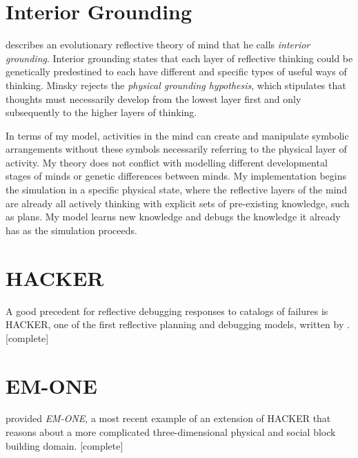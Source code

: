 \section{Interior Grounding}

\cite{minsky:2005} describes an evolutionary reflective theory of mind
that he calls \emph{interior grounding}.  Interior grounding states
that each layer of reflective thinking could be genetically
predestined to each have different and specific types of useful ways
of thinking.  Minsky rejects the \emph{physical grounding hypothesis},
which stipulates that thoughts must necessarily develop from the
lowest layer first and only subsequently to the higher layers of
thinking.

In terms of my model, activities in the mind can create and manipulate
symbolic arrangements without these symbols necessarily referring to
the physical layer of activity.  My theory does not conflict with
modelling different developmental stages of minds or genetic
differences between minds.  My implementation begins the simulation in
a specific physical state, where the reflective layers of the mind are
already all actively thinking with explicit sets of pre-existing
knowledge, such as plans.  My model learns new knowledge and debugs
the knowledge it already has as the simulation proceeds.

\section{HACKER}

A good precedent for reflective debugging responses to catalogs of
failures is HACKER, one of the first reflective planning and debugging
models, written by \cite{sussman:1973}.  [complete]

\section{EM-ONE}

\cite{singh:2005} provided \emph{EM-ONE}, a most recent example of an
extension of HACKER that reasons about a more complicated
three-dimensional physical and social block building domain.
[complete]

